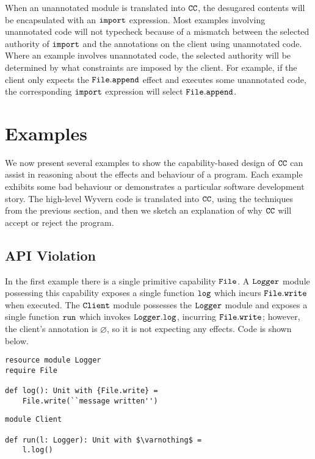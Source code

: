 When an unannotated module is translated into $\mathtt{CC}$, the desugared contents will be encapsulated with an $\mathtt{import}$ expression. Most examples involving unannotated code will not typecheck because of a mismatch between the selected authority of $\mathtt{import}$ and the annotations on the client using unannotated code. Where an example involves unannotated code, the selected authority will be determined by what constraints are imposed by the client. For example, if the client only expects the $\mathtt{File.append}$ effect and executes some unannotated code, the corresponding $\mathtt{import}$ expression will select $\mathtt{File.append}$.

\section{Examples}

We now present several examples to show the capability-based design of $\mathtt{CC}$ can assist in reasoning about the effects and behaviour of a program. Each example exhibits some bad behaviour or demonstrates a particular software development story. The high-level Wyvern code is translated into $\mathtt{CC}$, using the techniques from the previous section, and then we sketch an explanation of why $\mathtt{CC}$ will accept or reject the program.

\subsection{API Violation}

In the first example there is a single primitive capability $\mathtt{File}$. A $\mathtt{Logger}$ module possessing this capability exposes a single function $\mathtt{log}$ which incurs $\mathtt{File.write}$ when executed. The $\mathtt{Client}$ module possesses the $\mathtt{Logger}$ module and exposes a single function $\mathtt{run}$ which invokes $\mathtt{Logger.log}$, incurring $\mathtt{File.write}$; however, the client's annotation is $\varnothing$, so it is not expecting any effects. Code is shown below.

\begin{lstlisting}
resource module Logger
require File

def log(): Unit with {File.write} =
    File.write(``message written'')
\end{lstlisting}

\begin{lstlisting}
module Client

def run(l: Logger): Unit with $\varnothing$ =
    l.log()
\end{lstlisting}


